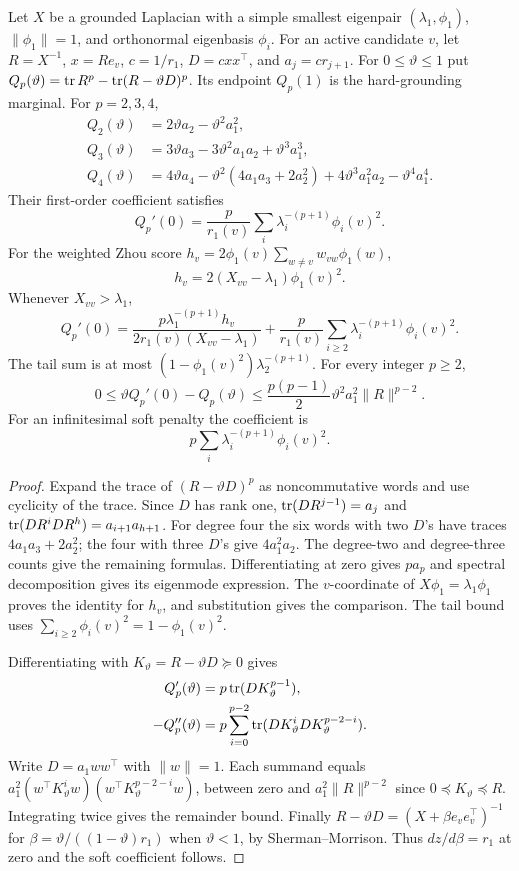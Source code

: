 \begin{proposition}
\label{prop:zhoutaylor}
Let $X$ be a grounded Laplacian with a simple smallest eigenpair
$(\lambda_1,\phi_1)$, $\|\phi_1\|=1$, and orthonormal eigenbasis
$\phi_i$. For an active candidate $v$, let $R=X^{-1}$,
$x=Re_v$, $c=1/r_1$, $D=cxx^\top$, and $a_j=cr_{j+1}$.
For $0\leq \vartheta\leq1$ put
$Q_p(\vartheta)=\operatorname{tr} R^p-\operatorname{tr}(R-\vartheta D)^p$. Its endpoint $Q_p(1)$ is the
hard-grounding marginal. For $p=2,3,4$,
\begin{align*}
 Q_2(\vartheta)&=2\vartheta a_2-\vartheta^2a_1^2,\\
 Q_3(\vartheta)&=3\vartheta a_3-3\vartheta^2a_1a_2+\vartheta^3a_1^3,\\
 Q_4(\vartheta)&=4\vartheta a_4-\vartheta^2(4a_1a_3+2a_2^2)
                       +4\vartheta^3a_1^2a_2-\vartheta^4a_1^4.
\end{align*}
Their first-order coefficient satisfies
\[
 Q_p'(0)=\frac p{r_1(v)}\sum_i\lambda_i^{-(p+1)}\phi_i(v)^2.
\]
For the weighted Zhou score
$h_v=2\phi_1(v)\sum_{w\ne v}w_{vw}\phi_1(w)$,
\[
 h_v=2(X_{vv}-\lambda_1)\phi_1(v)^2.
\]
Whenever $X_{vv}>\lambda_1$,
\[
 Q_p'(0)=\frac{p\lambda_1^{-(p+1)}h_v}
                    {2r_1(v)(X_{vv}-\lambda_1)}
       +\frac p{r_1(v)}\sum_{i\geq2}
                          \lambda_i^{-(p+1)}\phi_i(v)^2.
\]
The tail sum is at most
$(1-\phi_1(v)^2)\lambda_2^{-(p+1)}$.
For every integer $p\geq2$,
\[
 0\leq \vartheta Q_p'(0)-Q_p(\vartheta)
 \leq\frac{p(p-1)}2 \vartheta^2 a_1^2\|R\|^{p-2}.
\]
For an infinitesimal soft penalty the coefficient is
\[
 p\sum_i\lambda_i^{-(p+1)}\phi_i(v)^2.
\]
\end{proposition}
\begin{proof}
Expand the trace of $(R-\vartheta D)^p$ as noncommutative words and use
cyclicity of the trace. Since $D$ has rank one,
$\operatorname{tr}(DR^{j-1})=a_j$ and
$\operatorname{tr}(DR^iDR^h)=a_{i+1}a_{h+1}$.
For degree four the six words with two $D$'s have traces
$4a_1a_3+2a_2^2$; the four with three $D$'s give
$4a_1^2a_2$. The degree-two and degree-three counts give the
remaining formulas. Differentiating at zero gives $pa_p$ and
spectral decomposition gives its eigenmode expression. The
$v$-coordinate of $X\phi_1=\lambda_1\phi_1$ proves the identity
for $h_v$, and substitution gives the comparison. The tail bound
uses $\sum_{i\geq2}\phi_i(v)^2=1-\phi_1(v)^2$.

Differentiating with $K_\vartheta=R-\vartheta D\succeq0$ gives
\begin{align*}
 Q_p'(\vartheta)&=p\operatorname{tr}(DK_\vartheta^{p-1}),\\
 -Q_p''(\vartheta)&=p\sum_{i=0}^{p-2}\operatorname{tr}(DK_\vartheta^iDK_\vartheta^{p-2-i}).
\end{align*}
Write $D=a_1ww^\top$ with $\|w\|=1$. Each summand equals
$a_1^2(w^\top K_\vartheta^iw)(w^\top K_\vartheta^{p-2-i}w)$, between zero
and $a_1^2\|R\|^{p-2}$ since $0\preceq K_\vartheta\preceq R$.
Integrating twice gives the remainder bound. Finally
$R-\vartheta D=(X+\beta e_ve_v^\top)^{-1}$ for
$\beta=\vartheta/((1-\vartheta)r_1)$ when $\vartheta<1$, by Sherman--Morrison.
Thus $dz/d\beta=r_1$ at zero and the soft coefficient follows.
\end{proof}

